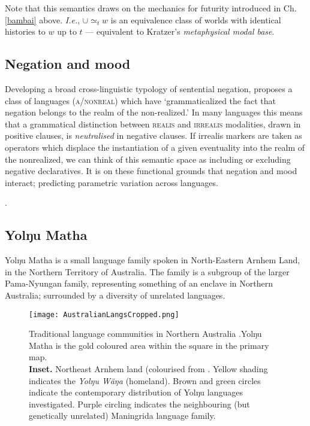 Note that this semantics draws on the mechanics for futurity introduced in Ch. \ref{bambai} above. \textit{I.e.}, $\cup\simeq_t w $ is an equivalence class of worlds with identical histories to $ w $ up to $ t $ --- equivalent to Kratzer's \textit{metaphysical modal base}.

\subsection{Negation and mood}

Developing a broad cross-linguistic typology of sentential negation, \citet[208]{Miestamo2005} proposes a class of languages (\textsc{a/nonreal}) which have `grammaticalized the fact that negation belongs to the realm of the non-realized.' In many languages this means that a grammatical distinction between \textsc{realis} and \textsc{irrealis} modalities, drawn in positive clauses, is \textit{neutralised} in negative clauses. If irrealis markers are taken as operators which displace the instantiation of a given eventuality into the realm of the nonrealized, we can think of this semantic space as including or excluding negative declaratives. It is on these functional grounds that negation and mood interact; predicting parametric variation across languages.




. 


\subsection{Yolŋu Matha}

Yolŋu Matha is a small language family spoken in North-Eastern Arnhem Land, in the Northern Territory of Australia. The family is a subgroup of the larger Pama-Nyungan family, representing something of an enclave in Northern Australia; surrounded by a diversity of unrelated languages.

\begin{figure}[h]
	\centering\caption{Traditional language communities in Northern Australia \citep{Horton1996}.Yolŋu Matha is the gold coloured area within the square in the primary map.\\\textbf{Inset. }Northeast Arnhem land (colourised from \citealt[2]{Wilkinson1991}. Yellow shading indicates the \textit{Yolŋu Wäŋa} (homeland). Brown and green circles indicate the contemporary distribution of Yolŋu languages investigated. Purple circling indicates the neighbouring (but genetically unrelated) Maningrida language family.}	\texttt{[image: AustralianLangsCropped.png]}\label{map}
\end{figure}


